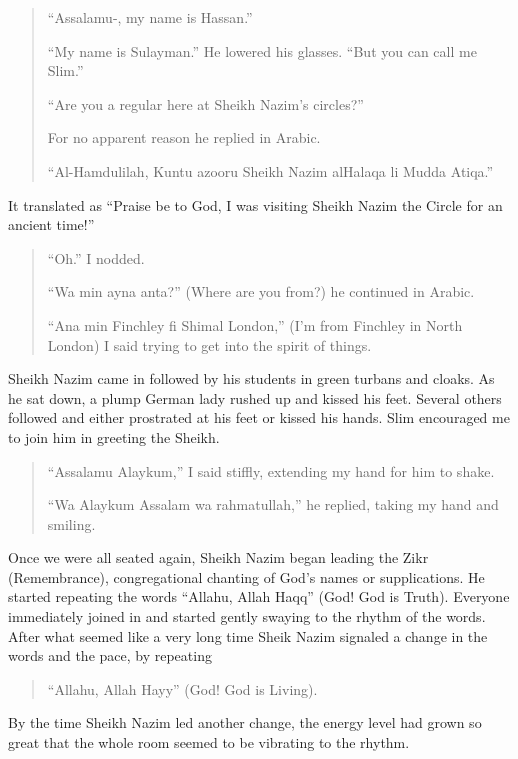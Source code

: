 \documentclass[12pt]{memoir}
\begin{document}
\begin{quote}
“Assalamu-, my name is Hassan.”

“My name is Sulayman.” He lowered his glasses.
“But you can call me Slim.”

“Are you a regular here at Sheikh Nazim’s circles?”

For no apparent reason he replied in Arabic.

“Al-Hamdulilah, Kuntu azooru Sheikh Nazim al\–Halaqa li Mudda Atiqa.”
\end{quote}

It translated as “Praise be to God,
I was visiting Sheikh Nazim the Circle for an ancient time!”

\begin{quote}
“Oh.” I nodded.

“Wa min ayna anta?” (Where are you from?) he continued in Arabic.

“Ana min Finchley fi Shimal London,”
(I’m from Finchley in North London)
I said trying to get into the spirit of things.
\end{quote}

Sheikh Nazim came in followed by his students in green turbans and cloaks.
As he sat down, a plump German lady rushed up and kissed his feet.
Several others followed and either prostrated at his feet or kissed his hands.
Slim encouraged me to join him in greeting the Sheikh.

\begin{quote}
“Assalamu Alaykum,” I said stiffly, extending my hand for him to shake.

“Wa Alaykum Assalam wa rahmatullah,” he replied, taking my hand and smiling.
\end{quote}

Once we were all seated again,
Sheikh Nazim began leading the Zikr (Remembrance),
congregational chanting of God’s names or supplications.
He started repeating the words “Allahu, Allah Haqq” (God! God is Truth).
Everyone immediately joined in
and started gently swaying to the rhythm of the words.
After what seemed like a very long time Sheik Nazim signaled a change
in the words and the pace, by repeating

\begin{quote}
“Allahu, Allah Hayy” (God! God is Living).
\end{quote}

By the time Sheikh Nazim led another change,
the energy level had grown so great
that the whole room seemed to be vibrating to the rhythm.
\end{document}
